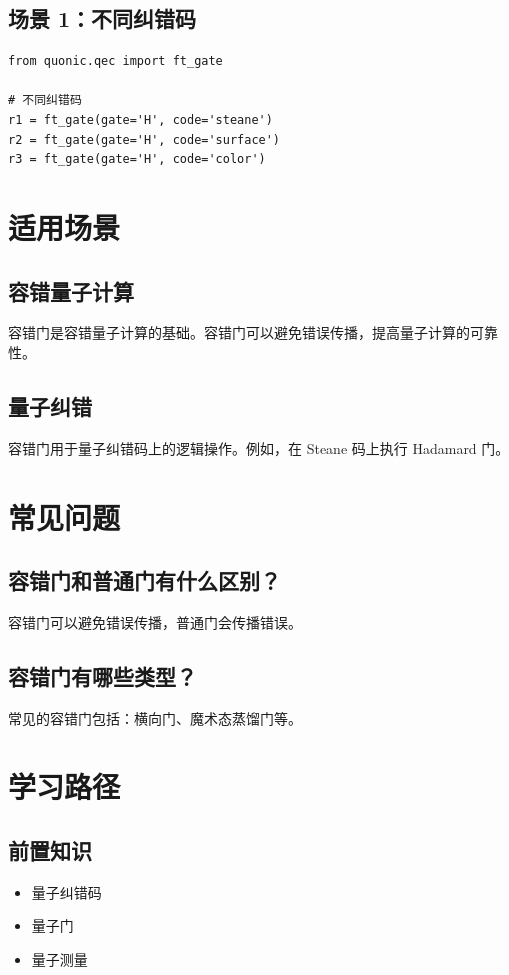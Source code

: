 \documentclass[12pt,a4paper]{article}
\begin{document}
\subsection{场景 1：不同纠错码}

\begin{verbatim}
from quonic.qec import ft_gate

# 不同纠错码
r1 = ft_gate(gate='H', code='steane')
r2 = ft_gate(gate='H', code='surface')
r3 = ft_gate(gate='H', code='color')
\end{verbatim}

\section{适用场景}

\subsection{容错量子计算}

容错门是容错量子计算的基础。容错门可以避免错误传播，提高量子计算的可靠性。

\subsection{量子纠错}

容错门用于量子纠错码上的逻辑操作。例如，在 Steane 码上执行 Hadamard 门。

\section{常见问题}

\subsection{容错门和普通门有什么区别？}

容错门可以避免错误传播，普通门会传播错误。

\subsection{容错门有哪些类型？}

常见的容错门包括：横向门、魔术态蒸馏门等。

\section{学习路径}

\subsection{前置知识}
\begin{itemize}
  \item 量子纠错码
  \item 量子门
  \item 量子测量
\end{itemize}
\end{document}
